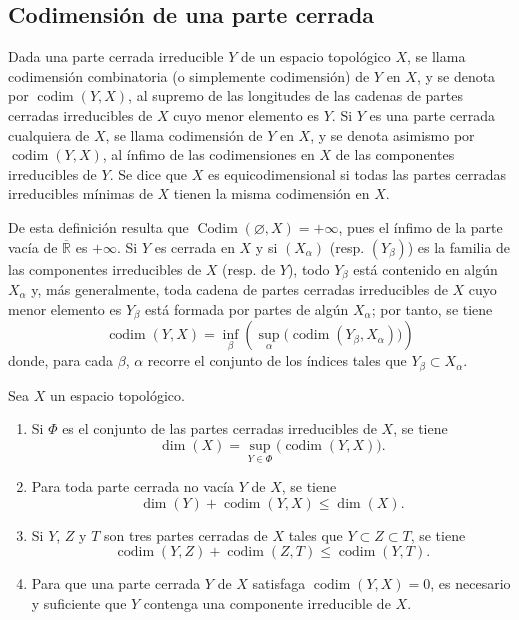 \subsection{Codimensión de una parte cerrada}
\label{subsection:0.14.2-fr}

\begin{definition}[14.2.1]
\label{0.14.2.1-fr}
Dada una parte cerrada irreducible $Y$ de un espacio topológico $X$, se llama
codimensión combinatoria \textup{(o simplemente} codimensión) de $Y$ en
$X$, y se denota por $\operatorname{codim}(Y,X)$, al supremo de las longitudes
de las cadenas de partes cerradas irreducibles de $X$ cuyo menor elemento es
$Y$. Si $Y$ es una parte cerrada cualquiera de $X$, se llama
codimensión de $Y$ en $X$, y se denota asimismo por
$\operatorname{codim}(Y,X)$, al ínfimo de las codimensiones en $X$ de las
componentes irreducibles de $Y$. Se dice que $X$ es
equicodimensional si todas las partes cerradas irreducibles mínimas de
$X$ tienen la misma codimensión en $X$.
\end{definition}

De esta definición resulta que
$\operatorname{Codim}(\varnothing,X)=+\infty$, pues el ínfimo de la parte vacía
de $\overline{\mathbb R}$ es $+\infty$. Si $Y$ es cerrada en $X$ y si
$(X_\alpha)$ (resp. $(Y_\beta)$) es la familia de las componentes irreducibles
de $X$ (resp. de $Y$), todo $Y_\beta$ está contenido en algún $X_\alpha$ y,
más generalmente, toda cadena de partes cerradas irreducibles de $X$ cuyo menor
elemento es $Y_\beta$ está formada por partes de algún $X_\alpha$; por tanto,
se tiene
\[
  \operatorname{codim}(Y,X)=
  \inf_\beta\left(\sup_\alpha
  \bigl(\operatorname{codim}(Y_\beta,X_\alpha)\bigr)\right)
  \tag{14.2.1.1}\label{0.14.2.1.1-fr}
\]
donde, para cada $\beta$, $\alpha$ recorre el conjunto de los índices tales que
$Y_\beta\subset X_\alpha$.

\begin{proposition}[14.2.2]
\label{0.14.2.2-fr}
Sea $X$ un espacio topológico.
\begin{enumerate}
  \item[\rm(i)] Si $\Phi$ es el conjunto de las partes cerradas irreducibles de
  $X$, se tiene
  \[
    \dim(X)=\sup_{Y\in\Phi}\bigl(\operatorname{codim}(Y,X)\bigr).
    \tag{14.2.2.1}\label{0.14.2.2.1-fr}
  \]
  \item[\rm(ii)] Para toda parte cerrada no vacía $Y$ de $X$, se tiene
  \[
    \dim(Y)+\operatorname{codim}(Y,X)\leq\dim(X).
    \tag{14.2.2.2}\label{0.14.2.2.2-fr}
  \]
  \item[\rm(iii)] Si $Y$, $Z$ y $T$ son tres partes cerradas de $X$ tales que
  $Y\subset Z\subset T$, se tiene
  \[
    \operatorname{codim}(Y,Z)+\operatorname{codim}(Z,T)
    \leq\operatorname{codim}(Y,T).
    \tag{14.2.2.3}\label{0.14.2.2.3-fr}
  \]
  \item[\rm(iv)] Para que una parte cerrada $Y$ de $X$ satisfaga
  $\operatorname{codim}(Y,X)=0$, es necesario y suficiente que $Y$ contenga
  una componente irreducible de $X$.
\end{enumerate}
\end{proposition}


